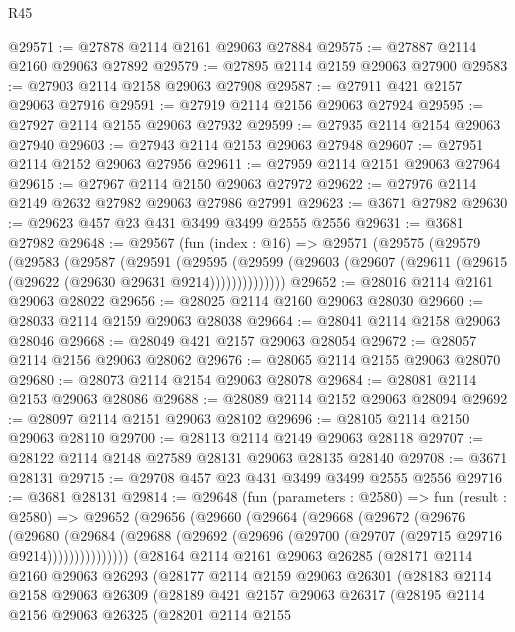 \begin{lexlean}{R45}
\begin{coremodule}
@29571 := @27878 @2114 @2161 @29063 @27884
@29575 := @27887 @2114 @2160 @29063 @27892
@29579 := @27895 @2114 @2159 @29063 @27900
@29583 := @27903 @2114 @2158 @29063 @27908
@29587 := @27911 @421 @2157 @29063 @27916
@29591 := @27919 @2114 @2156 @29063 @27924
@29595 := @27927 @2114 @2155 @29063 @27932
@29599 := @27935 @2114 @2154 @29063 @27940
@29603 := @27943 @2114 @2153 @29063 @27948
@29607 := @27951 @2114 @2152 @29063 @27956
@29611 := @27959 @2114 @2151 @29063 @27964
@29615 := @27967 @2114 @2150 @29063 @27972
@29622 := @27976 @2114 @2149 @2632 @27982 @29063 @27986 @27991
@29623 := @3671 @27982
@29630 := @29623 @457 @23 @431 @3499 @3499 @2555 @2556
@29631 := @3681 @27982
@29648 := @29567
    (fun (index : @16) =>
    @29571
      (@29575
        (@29579
          (@29583
            (@29587
              (@29591
                (@29595
                  (@29599 (@29603 (@29607 (@29611 (@29615 (@29622 (@29630 @29631 @9214))))))))))))))
@29652 := @28016 @2114 @2161 @29063 @28022
@29656 := @28025 @2114 @2160 @29063 @28030
@29660 := @28033 @2114 @2159 @29063 @28038
@29664 := @28041 @2114 @2158 @29063 @28046
@29668 := @28049 @421 @2157 @29063 @28054
@29672 := @28057 @2114 @2156 @29063 @28062
@29676 := @28065 @2114 @2155 @29063 @28070
@29680 := @28073 @2114 @2154 @29063 @28078
@29684 := @28081 @2114 @2153 @29063 @28086
@29688 := @28089 @2114 @2152 @29063 @28094
@29692 := @28097 @2114 @2151 @29063 @28102
@29696 := @28105 @2114 @2150 @29063 @28110
@29700 := @28113 @2114 @2149 @29063 @28118
@29707 := @28122 @2114 @2148 @27589 @28131 @29063 @28135 @28140
@29708 := @3671 @28131
@29715 := @29708 @457 @23 @431 @3499 @3499 @2555 @2556
@29716 := @3681 @28131
@29814 := @29648
    (fun (parameters : @2580) =>
    fun (result : @2580) =>
    @29652
      (@29656
        (@29660
          (@29664
            (@29668
              (@29672
                (@29676
                  (@29680
                    (@29684
                      (@29688 (@29692 (@29696 (@29700 (@29707 (@29715 @29716 @9214)))))))))))))))
    (@28164
      @2114
      @2161
      @29063
      @26285
      (@28171
        @2114
        @2160
        @29063
        @26293
        (@28177
          @2114
          @2159
          @29063
          @26301
          (@28183
            @2114
            @2158
            @29063
            @26309
            (@28189
              @421
              @2157
              @29063
              @26317
              (@28195
                @2114
                @2156
                @29063
                @26325
                (@28201
                  @2114
                  @2155

\end{coremodule}
\end{lexlean}

